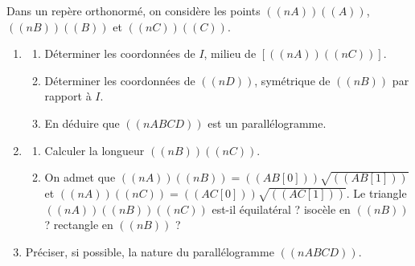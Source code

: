 \exercice

Dans un repère orthonormé, on considère les points $((nA))((A))$, $((nB))((B))$ et $((nC))((C))$.

\begin{enumerate}
  \item
\begin{enumerate}
  \item Déterminer les coordonnées de $I$, milieu de $[((nA))((nC))]$.
  \item Déterminer les coordonnées de $((nD))$, symétrique de $((nB))$ par rapport à $I$.
  \item En déduire que $((nABCD))$ est un parallélogramme.
\end{enumerate}
\item
\begin{enumerate}
  \item Calculer la longueur $((nB))((nC))$.
  \item On admet que $((nA))((nB))=((AB[0]))\sqrt{((AB[1]))}$ et $((nA))((nC))=((AC[0]))\sqrt{((AC[1]))}$. Le triangle $((nA))((nB))((nC))$ est-il équilatéral ? isocèle en $((nB))$ ? rectangle en $((nB))$ ?
\end{enumerate}
\item Préciser, si possible, la nature du parallélogramme $((nABCD))$.
\end{enumerate}
